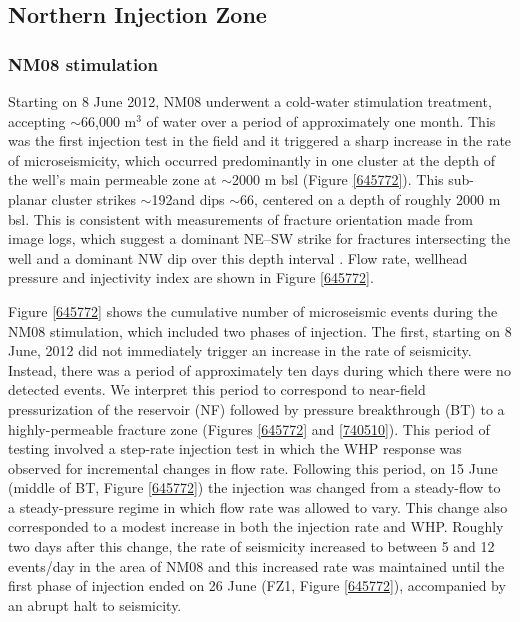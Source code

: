 \subsection{Northern Injection Zone}
\subsubsection{NM08 stimulation}\label{NM08_stimulation}
Starting on 8 June 2012, NM08 underwent a cold-water stimulation treatment, accepting $\sim$66,000 m$^3$ of water over a period of approximately one month. This was the first injection test in the field and it triggered a sharp increase in the rate of microseismicity, which occurred predominantly in one cluster at the depth of the well's main permeable zone at $\sim$2000 m bsl (Figure \ref{645772}). This sub-planar cluster strikes $\sim$192\textdegree and dips $\sim$66\textdegree, centered on a depth of roughly 2000 m bsl. This is consistent with measurements of fracture orientation made from image logs, which suggest a dominant NE--SW strike for fractures intersecting the well and a dominant NW dip over this depth interval \citep{massiot_2012}. Flow rate, wellhead pressure and injectivity index are shown in Figure \ref{645772}.

Figure \ref{645772} shows the cumulative number of microseismic events during the NM08 stimulation, which included two phases of injection. The first, starting on 8 June, 2012 did not immediately trigger an increase in the rate of seismicity. Instead, there was a period of approximately ten days during which there were no detected events. We interpret this period to correspond to near-field pressurization of the reservoir (NF) followed by pressure breakthrough (BT) to a highly-permeable fracture zone (Figures \ref{645772} and \ref{740510}). This period of testing involved a step-rate injection test in which the WHP response was observed for incremental changes in flow rate. Following this period, on 15 June (middle of BT, Figure \ref{645772}) the injection was changed from a steady-flow to a steady-pressure regime in which flow rate was allowed to vary. This change also corresponded to a modest increase in both the injection rate and WHP. Roughly two days after this change, the rate of seismicity increased to between 5 and 12 events/day in the area of NM08 and this increased rate was maintained until the first phase of injection ended on 26 June (FZ1, Figure \ref{645772}), accompanied by an abrupt halt to seismicity.

